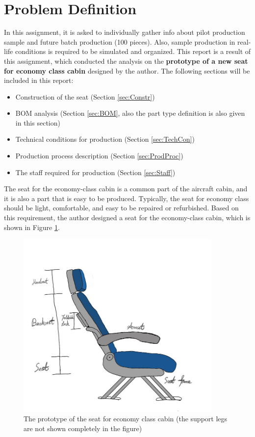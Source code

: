 \section{Problem Definition}
In this assignment, it is asked to individually gather info about pilot production sample and future batch production (100 pieces).
Also, sample production in real-life conditions is required to be simulated and organized.
This report is a result of this assignment, which conducted the analysis on the \textbf{prototype of a new seat for economy class cabin}
designed by the author. The following sections will be included in this report:
\begin{itemize}
    \item Construction of the seat (Section \ref{sec:Constr})
    \item BOM analysis (Section \ref{sec:BOM}, also the part type definition is also given in this section)
    \item Technical conditions for production (Section \ref{sec:TechCon})
    \item Production process description (Section \ref{sec:ProdProc})
    \item The staff required for production (Section \ref{sec:Staff})
\end{itemize}

The seat for the economy-class cabin is a common part of the aircraft cabin, and it is also a part that is easy to be produced.
Typically, the seat for economy class should be light, comfortable, and easy to be repaired or refurbished.
Based on this requirement, the author designed a seat for the economy-class cabin, which is shown in Figure \ref{fig:Seat}.

\begin{figure}[!htp]
    \centering
    \includegraphics[width=0.9\textwidth]{images/Seat.jpg}
    \caption{The prototype of the seat for economy class cabin (the support legs are not shown completely in the figure)}
    \label{fig:Seat}
\end{figure}

